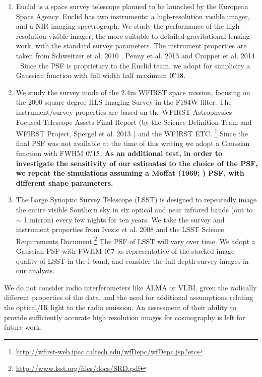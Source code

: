 \documentclass[a4paper,11pt]{article}
\begin{document}
\begin{enumerate}
\item Euclid is a space survey telescope planned to be launched by the
European Space Agency. Euclid has two instruments: a high-resolution
visible imager, and a NIR imaging spectrograph. We study the performance
of the high-resolution visible imager, the more suitable to detailed
gravitational lensing work, with the standard survey parameters.  The
instrument properties are taken from Schweitzer et al. 2010
\cite{2010SPIE.7731E..1KS}, Penny et al. 2013
\cite{2013MNRAS.434....2P} and Cropper et al. 2014
\cite{2014SPIE.9143E..0JC}. Since the PSF is proprietary to the Euclid
team, we adopt for simplicity a Gaussian function with full width half
maximum $0\hbox{$.\!\!^{\prime\prime}$}18$.

\item We study the survey mode of the 2.4m WFIRST space mission,
focusing on the 2000 square degree HLS Imaging Survey in the F184W
filter. The instrument/survey properties are based on the
WFIRST-Astrophysics Focused Telescope Assets Final Report (by the
Science Definition Team and WFIRST Project, Spergel et al. 2013
\cite{2013arXiv1305.5422S}) and the WFIRST ETC.
\footnote{\url{http://wfirst-web.ipac.caltech.edu/wfDepc/wfDepc.jsp?etc}}
Since the final PSF was not available at the time of this writing we
adopt a Gaussian function with FWHM $0\hbox{$.\!\!^{\prime\prime}$}15$. {\bf As an additional
test, in order to investigate the sensitivity of our estimates to the
choice of the PSF, we repeat the simulations assuming a Moffat (1969;
\cite{1969A&A.....3..455M}) PSF, with different shape parameters.}

\item The Large Synoptic Survey Telescope (LSST) is designed to
repeatedly image the entire visible Southern sky in six optical and
near infrared bands (out to $\sim$ 1 micron) every few nights for ten
years. We take the survey and instrument properties from Ivezic et
al. 2008 \cite{2008arXiv0805.2366I} and the LSST Science Requirements
Document.\footnote{\url{http://www.lsst.org/files/docs/SRD.pdf}} The
PSF of LSST will vary over time. We adopt a Gaussian PSF with FWHM
$0\hbox{$.\!\!^{\prime\prime}$}7$ as representative of the stacked image quality of LSST in
the i-band, and consider the full depth survey images in our analysis.

\end{enumerate}

We do not consider radio interferometers like ALMA or VLBI, given the
radically different properties of the data, and the need for
additional assumptions relating the optical/IR light to the radio
emission. An assessment of their ability to provide sufficiently
accurate high resolution images for cosmography is left for future
work.
\end{document}
